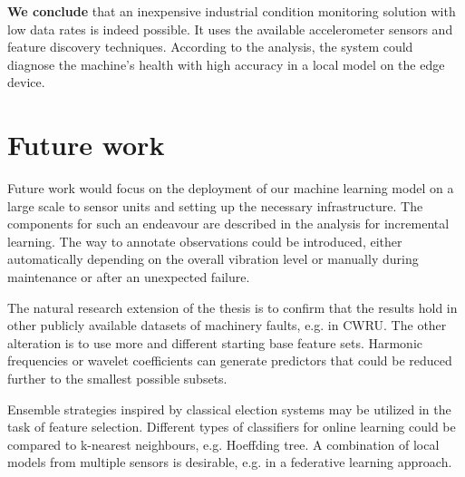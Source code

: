 \textbf{We conclude} that an inexpensive industrial condition monitoring solution with low data rates is indeed possible. It uses the available accelerometer sensors and feature discovery techniques. According to the analysis, the system could diagnose the machine's health with high accuracy in a local model on the edge device.

\section{Future work}
Future work would focus on the deployment of our machine learning model on a large scale to sensor units and setting up the necessary infrastructure. The components for such an endeavour are described in the analysis for incremental learning. The way to annotate observations could be introduced, either automatically depending on the overall vibration level or manually during maintenance or after an unexpected failure.

The natural research extension of the thesis is to confirm that the results hold in other publicly available datasets of machinery faults, e.g. in CWRU. The other alteration is to use more and different starting base feature sets. Harmonic frequencies or wavelet coefficients can generate predictors that could be reduced further to the smallest possible subsets. 

Ensemble strategies inspired by classical election systems may be utilized in the task of feature selection. Different types of classifiers for online learning could be compared to k-nearest neighbours, e.g. Hoeffding tree. A combination of local models from multiple sensors is desirable, e.g. in a federative learning approach.